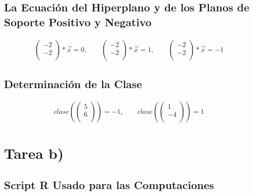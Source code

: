 \documentclass[fleqn]{llncs}
\begin{document}
\subsection{La Ecuación del Hiperplano y de los Planos de Soporte Positivo y Negativo}
\begin{align*}
	\begin{pmatrix}
		-2 \\
		-2 \\
	\end{pmatrix} * \overrightarrow{x} = 0,
	\qquad
	\begin{pmatrix}
		-2 \\
		-2 \\
	\end{pmatrix} * \overrightarrow{x} = 1,
	\qquad
	\begin{pmatrix}
		-2 \\
		-2 \\
	\end{pmatrix} * \overrightarrow{x} = -1
\end{align*}

\subsection{Determinación de la Clase}
\begin{align*}
	clase \left(
	\begin{pmatrix}
		5 \\
		6 \\
	\end{pmatrix} \right) = -1,
	\qquad
	clase \left(
	\begin{pmatrix}
		1 \\
		-4 \\
	\end{pmatrix} \right) = 1
\end{align*}


\newpage


\section{Tarea b)}

\subsection{Script R Usado para las Computaciones}


\newpage
\end{document}
